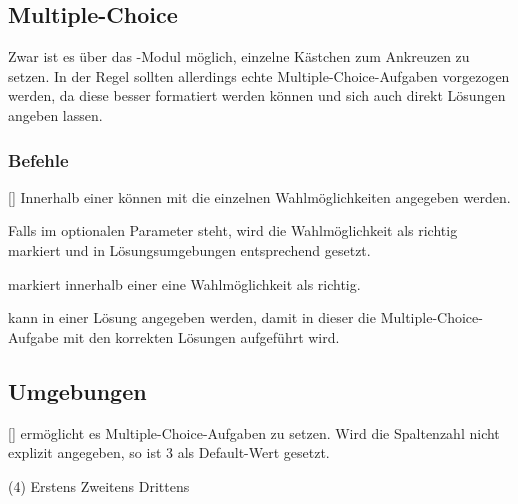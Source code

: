 \subsection{Multiple-Choice}
Zwar ist es über das -Modul möglich, einzelne Kästchen zum Ankreuzen zu setzen. In der Regel sollten allerdings echte Multiple-Choice-Aufgaben vorgezogen werden, da diese besser formatiert werden können und sich auch direkt Lösungen angeben lassen.


\subsubsection{Befehle}
\begin{commands}
    [] Innerhalb einer  können mit  die einzelnen Wahlmöglichkeiten angegeben werden.

        Falls im optionalen Parameter  steht, wird die Wahlmöglichkeit als richtig markiert und in Lösungsumgebungen entsprechend gesetzt.

     markiert innerhalb einer  eine Wahlmöglichkeit als richtig.

     kann in einer Lösung angegeben werden, damit in dieser die Multiple-Choice-Aufgabe mit den korrekten Lösungen aufgeführt wird.
\end{commands}

\subsection{Umgebungen}
    \begin{environments}
        [] ermöglicht es Multiple-Choice-Aufgaben zu setzen. Wird die Spaltenzahl nicht explizit angegeben, so ist 3 als Default-Wert gesetzt.
    \end{environments}

    \begin{sourcecode}[gobble=8]
        \begin{aufgabe}
            \begin{mcumgebung}(4)
                \choice[\mcrichtig] Erstens
                \choice Zweitens
                \choice[\mcrichtig] Drittens
            \end{mcumgebung}
        \end{aufgabe}
        \begin{loesung}
            \mcloesung
        \end{loesung}
    \end{sourcecode}

